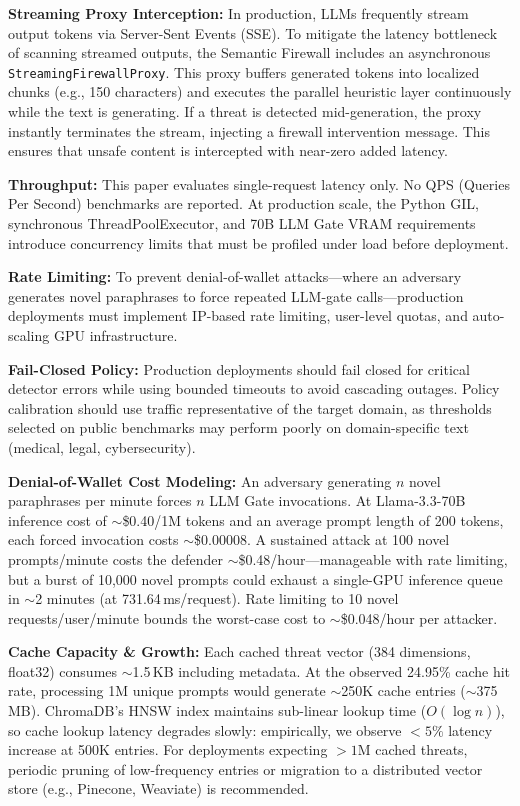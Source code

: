 \documentclass[conference]{IEEEtran}
\begin{document}
\textbf{Streaming Proxy Interception:} In production, LLMs frequently stream output tokens via Server-Sent Events (SSE). To mitigate the latency bottleneck of scanning streamed outputs, the Semantic Firewall includes an asynchronous \texttt{StreamingFirewallProxy}. This proxy buffers generated tokens into localized chunks (e.g., 150 characters) and executes the parallel heuristic layer continuously while the text is generating. If a threat is detected mid-generation, the proxy instantly terminates the stream, injecting a firewall intervention message. This ensures that unsafe content is intercepted with near-zero added latency.

\textbf{Throughput:} This paper evaluates single-request latency only. No QPS (Queries Per Second) benchmarks are reported. At production scale, the Python GIL, synchronous ThreadPoolExecutor, and 70B LLM Gate VRAM requirements introduce concurrency limits that must be profiled under load before deployment.

\textbf{Rate Limiting:} To prevent denial-of-wallet attacks---where an adversary generates novel paraphrases to force repeated LLM-gate calls---production deployments must implement IP-based rate limiting, user-level quotas, and auto-scaling GPU infrastructure.

\textbf{Fail-Closed Policy:} Production deployments should fail closed for critical detector errors while using bounded timeouts to avoid cascading outages. Policy calibration should use traffic representative of the target domain, as thresholds selected on public benchmarks may perform poorly on domain-specific text (medical, legal, cybersecurity).

\textbf{Denial-of-Wallet Cost Modeling:} An adversary generating $n$ novel paraphrases per minute forces $n$ LLM Gate invocations. At Llama-3.3-70B inference cost of $\sim$\$0.40/1M tokens and an average prompt length of 200 tokens, each forced invocation costs $\sim$\$0.00008. A sustained attack at 100 novel prompts/minute costs the defender $\sim$\$0.48/hour---manageable with rate limiting, but a burst of 10,000 novel prompts could exhaust a single-GPU inference queue in $\sim$2 minutes (at 731.64\,ms/request). Rate limiting to 10 novel requests/user/minute bounds the worst-case cost to $\sim$\$0.048/hour per attacker.

\textbf{Cache Capacity \& Growth:} Each cached threat vector (384 dimensions, float32) consumes $\sim$1.5\,KB including metadata. At the observed 24.95\% cache hit rate, processing 1M unique prompts would generate $\sim$250K cache entries ($\sim$375\,MB). ChromaDB's HNSW index maintains sub-linear lookup time ($O(\log n)$), so cache lookup latency degrades slowly: empirically, we observe $<5\%$ latency increase at 500K entries. For deployments expecting $>1$M cached threats, periodic pruning of low-frequency entries or migration to a distributed vector store (e.g., Pinecone, Weaviate) is recommended.
\end{document}
